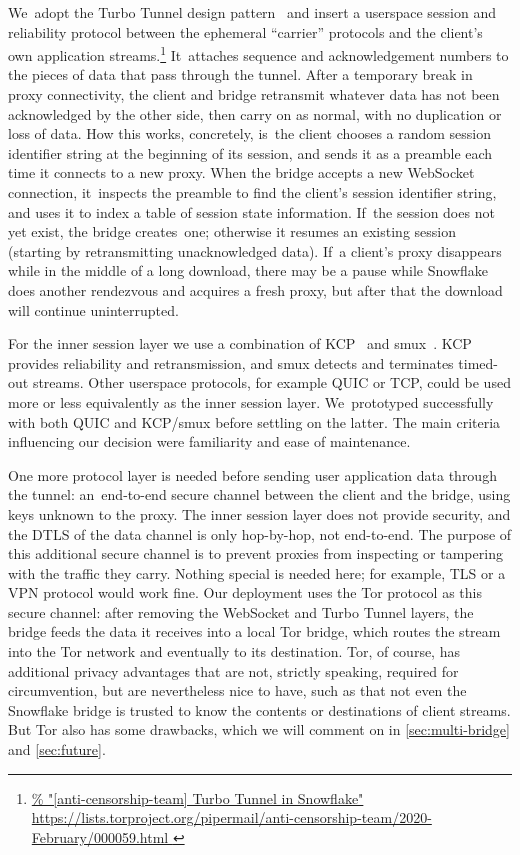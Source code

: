 \documentclass[letterpaper,twocolumn]{article}
\newlength{\urlfootnotesize}
\newcommand{\urlfootnote}[1]{\footnote{
\raggedright\hangindent\footnotemargin%
\fontsize{\urlfootnotesize}{\urlfootnotesize}\selectfont%
\url{#1}
}}
\begin{document}
We~adopt the
Turbo Tunnel design pattern~\cite{Fifield2020a}
and insert a userspace
session and reliability protocol
between the ephemeral ``carrier'' protocols
and the client's own application streams.\urlfootnote{
https://lists.torproject.org/pipermail/anti-censorship-team/2020-February/000059.html
}
It~attaches sequence and acknowledgement numbers
to the pieces of data that pass through the tunnel.
After a temporary break in proxy connectivity,
the client and bridge retransmit whatever data has not been acknowledged
by the other side,
then carry on as normal,
with no duplication or loss of data.
How this works, concretely,
is~the client chooses a random session identifier string
at the beginning of its session,
and sends it as a preamble each time it
connects to a new proxy.
When the bridge accepts a new WebSocket connection,
it~inspects the preamble to find the client's session identifier string,
and uses it to index a table of session state information.
If~the session does not yet exist,
the bridge creates~one;
otherwise it resumes an existing session
(starting by retransmitting unacknowledged data).
If~a client's proxy disappears
while in the middle of a long download,
there may be a pause while Snowflake
does another rendezvous and acquires a fresh proxy,
but after that the download will continue uninterrupted.

For the inner session layer we use a combination of
KCP~\cite{kcp} and
smux~\cite{smux}.
KCP provides reliability and retransmission,
and smux detects and terminates timed-out streams.
Other userspace protocols, for example QUIC or TCP,
could be used more or less equivalently
as the inner session layer.
We~prototyped successfully with both QUIC and KCP/\allowbreak smux
before settling on the latter.
The main criteria influencing our decision
were familiarity and ease of maintenance.

One more protocol layer is needed
before sending user application data through the tunnel:
an~end-to-end secure channel between the client and the bridge,
using keys unknown to the proxy.
The inner session layer does not provide security,
and the DTLS of the data channel is only hop-by-hop,
not end-to-end.
The purpose of this additional secure channel is
to prevent proxies from inspecting or tampering with the traffic
they carry.
Nothing special is needed here; for example,
TLS or a VPN protocol
would work fine.
Our deployment uses the Tor protocol as this secure channel:
after removing the WebSocket and Turbo Tunnel layers,
the bridge feeds the data it receives into a local Tor bridge,
which routes the stream into the Tor network
and eventually to its destination.
Tor, of course, has additional privacy advantages
that are not, strictly speaking, required for circumvention,
but are nevertheless nice to have,
such as that not even the Snowflake bridge
is trusted to know the contents or destinations of client streams.
But Tor also has some drawbacks,
which we will comment on in
\autoref{sec:multi-bridge}
and
\autoref{sec:future}.
\end{document}
